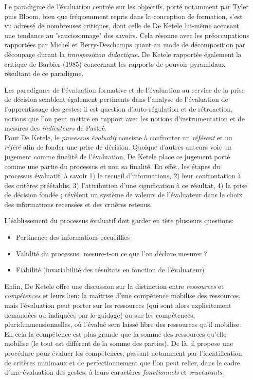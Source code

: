 \documentclass{article}
\begin{document}
Le paradigme de l'évaluation centrée sur les objectifs, porté notamment
par Tyler puis Bloom, bien que fréquemment repris dans la conception de 
formation, s'est vu adressé de nombreuses critiques, dont celle de 
De Ketele lui-même accusant une tendance au "saucissonnage" des savoirs.
Cela résonne avec les préoccupations rapportées par Michel et Berry-Deschamps
\cite{michel_lapprentissage_2008} quant au mode de décomposition par 
découpage durant la \emph{transposition didactique}. De Ketele rapportée
également la critique de Barbier (1985) concernant les rapports de 
pouvoir pyramidaux résultant de ce paradigme.

Les paradigmes de l'évaluation formative et de l'évaluation au service de
la prise de décision semblent également pertinents dans l'analyse de 
l'évaluation de l'apprentissage des gestes: il est question 
d'auto-régulation et de rétroaction, notions que l'on peut mettre en 
rapport avec les notions d'instrumentation et de mesures des 
\emph{indicateurs} de Pastré.
\\

Pour De Ketele, le \emph{processus évaluatif} consiste à confronter un 
\emph{référent} et un \emph{référé} afin de fonder une prise de décision. 
Quoique d'autres auteurs voie un jugement comme finalité de l'évaluation, 
De Ketele place ce jugement porté comme une partie du processus et non sa 
finalité. En effet, les étapes du processus évaluatif, à savoir 1) le 
recueil d'informations, 2) leur confrontation à des critères préétablis, 
3) l'attribution d'une signification à ce résultat, 4) la prise de 
décision fondée ; révèlent un système de valeurs de l'évaluateur dans le 
choix des informations recensées et des critères retenus.

L'éablissement du processus évaluatif doit garder en tête plusieurs 
questions:
\begin{itemize}
    \item Pertinence des informations recueillies
    \item Validité du processus: mesure-t-on ce que l'on déclare mesurer ?
    \item Fiabilité (invariabilité des résultats en fonction de 
    l'évaluateur)
\end{itemize}

Enfin, De Ketele offre une discussion sur la distinction entre 
\emph{ressources} et \emph{compétences} et leurs lien: la maîtrise d'une 
compétence mobilise des ressources, mais l'évaluation peut porter sur les 
ressources (qui sont alors explicitement demandées ou indiquées par le 
guidage) ou sur les compétences, pluridimmensionnelles, où l'évalué sera 
laissé libre des ressources qu'il mobilise. En cela la compétence est 
plus grande que la somme des ressources qu'elle mobilise (le tout est 
différent de la somme des parties).
De là, il propose une procédure pour évaluer les compétences, passant 
notamment par l'identification de critères minimaux et de 
perfectionnement que l'on peut relier, dans le cadre d'une évaluation 
des gestes, à leurs caractères \emph{fonctionnels} et \emph{sructurants}.
\\
\end{document}
